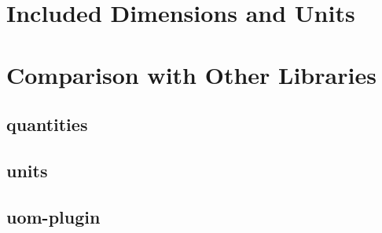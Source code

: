 \documentclass[11pt]{report}
\begin{document}
\chapter{Included Dimensions and Units}

\chapter{Comparison with Other Libraries}

\section{quantities}
\section{units}
\section{uom-plugin}
\end{document}

